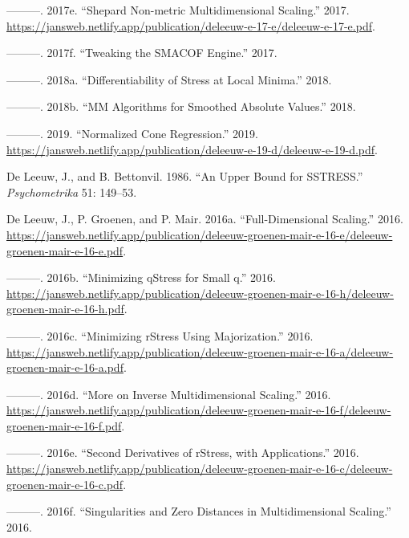 \documentclass[
  12pt,
  letterpaper,
  DIV=11,
  numbers=noendperiod]{scrreprt}
\newlength{\cslhangindent}
\newenvironment{CSLReferences}[2] %
 {\begin{list}{}{%
  \setlength{\itemindent}{0pt}
  \setlength{\leftmargin}{0pt}
  \setlength{\parsep}{0pt}
  \ifodd #1
   \setlength{\leftmargin}{\cslhangindent}
   \setlength{\itemindent}{-1\cslhangindent}
  \fi
  \setlength{\itemsep}{#2\baselineskip}}}
 {\end{list}}
\theoremstyle{remark}
\begin{document}
\begin{CSLReferences}{1}{0}
---------. 2017e. {``{Shepard Non-metric Multidimensional Scaling}.''}
2017.
\url{https://jansweb.netlify.app/publication/deleeuw-e-17-e/deleeuw-e-17-e.pdf}.

---------. 2017f. {``{Tweaking the SMACOF Engine}.''} 2017.

---------. 2018a. {``{Differentiability of Stress at Local Minima}.''}
2018.

---------. 2018b. {``{MM Algorithms for Smoothed Absolute Values}.''}
2018.

---------. 2019. {``Normalized Cone Regression.''} 2019.
\url{https://jansweb.netlify.app/publication/deleeuw-e-19-d/deleeuw-e-19-d.pdf}.

De Leeuw, J., and B. Bettonvil. 1986. {``An Upper Bound for
{SSTRESS}.''} \emph{Psychometrika} 51: 149--53.

De Leeuw, J., P. Groenen, and P. Mair. 2016a. {``Full-Dimensional
Scaling.''} 2016.
\url{https://jansweb.netlify.app/publication/deleeuw-groenen-mair-e-16-e/deleeuw-groenen-mair-e-16-e.pdf}.

---------. 2016b. {``Minimizing qStress for Small q.''} 2016.
\url{https://jansweb.netlify.app/publication/deleeuw-groenen-mair-e-16-h/deleeuw-groenen-mair-e-16-h.pdf}.

---------. 2016c. {``{Minimizing rStress Using Majorization}.''} 2016.
\url{https://jansweb.netlify.app/publication/deleeuw-groenen-mair-e-16-a/deleeuw-groenen-mair-e-16-a.pdf}.

---------. 2016d. {``More on Inverse Multidimensional Scaling.''} 2016.
\url{https://jansweb.netlify.app/publication/deleeuw-groenen-mair-e-16-f/deleeuw-groenen-mair-e-16-f.pdf}.

---------. 2016e. {``{Second Derivatives of rStress, with
Applications}.''} 2016.
\url{https://jansweb.netlify.app/publication/deleeuw-groenen-mair-e-16-c/deleeuw-groenen-mair-e-16-c.pdf}.

---------. 2016f. {``Singularities and Zero Distances in
Multidimensional Scaling.''} 2016.


\end{CSLReferences}
\end{document}

